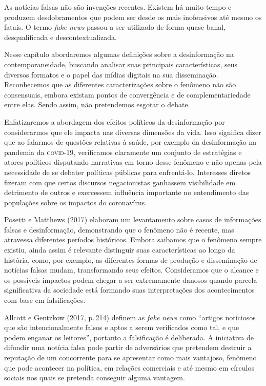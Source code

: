 As notícias falsas não são invenções recentes. Existem há muito tempo e
produzem desdobramentos que podem ser desde os mais inofensivos até
mesmo os fatais. O termo \textit{fake news} passou a ser utilizado de
forma quase banal, desqualificada e descontextualizada.

Nesse capítulo abordaremos algumas definições sobre a desinformação na
contemporaneidade, buscando analisar suas principais características,
seus diversos formatos e o papel das mídias digitais na sua
disseminação. Reconhecemos que as diferentes caracterizações sobre o
fenômeno não são consensuais, embora existam pontos de convergência e de
complementariedade entre elas. Sendo assim, não pretendemos esgotar o
debate.

Enfatizaremos a abordagem dos efeitos políticos da desinformação por
considerarmos que ele impacta nas diversas dimensões da vida. Isso
significa dizer que ao falarmos de questões relativas à saúde, por
exemplo da desinformação na pandemia da \textsc{covid-19}, verificamos claramente
um conjunto de estratégias e atores políticos disputando narrativas em
torno desse fenômeno e não apenas pela necessidade de se debater
políticas públicas para enfrentá-lo. Interesses diretos fizeram com que
certos discursos negacionistas ganhassem visibilidade em detrimento de
outros e exercessem influência importante no entendimento das populações
sobre os impactos do coronavírus.

Posetti e Matthews (2017) elaboram um levantamento sobre casos de
informações falsas e desinformação, demonstrando que o fenômeno não é
recente, mas atravessa diferentes períodos históricos. Embora saibamos
que o fenômeno sempre existiu, ainda assim é relevante distinguir suas
características ao longo da história, como, por exemplo, as diferentes
formas de produção e disseminação de notícias falsas mudam,
transformando seus efeitos. Consideramos que o alcance e os possíveis
impactos podem chegar a ser extremamente danosos quando parcela
significativa da sociedade está formando suas interpretações dos
acontecimentos com base em falsificações.

Allcott e Gentzkow (2017, p.\,214) definem as \textit{fake news} como ``artigos
noticiosos que são intencionalmente falsos e aptos a serem verificados
como tal, e que podem enganar os leitores'', portanto a falsificação é deliberada. A iniciativa de difundir uma
notícia falsa pode partir de adversários que pretendem destruir a
reputação de um concorrente para se apresentar como mais vantajoso,
fenômeno que pode acontecer na política, em relações comerciais e até
mesmo em círculos sociais nos quais se pretenda conseguir alguma
vantagem.

